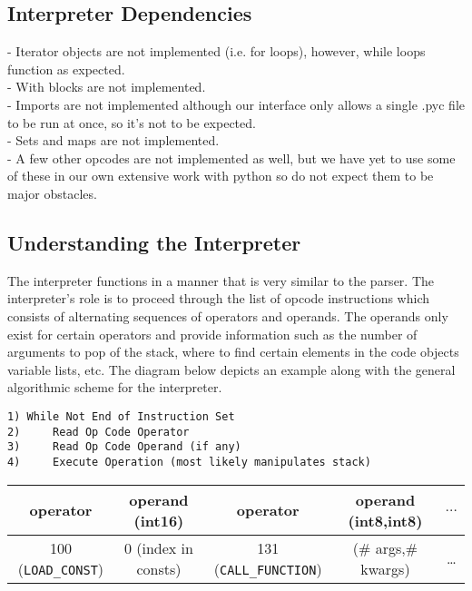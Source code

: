 \documentclass{article}
\begin{document}
\subsection{Interpreter Dependencies}

- Iterator objects are not implemented (i.e. for loops), however, while loops function as expected.\\
- With blocks are not implemented.\\
- Imports are not implemented although our interface only allows a single .pyc file to be run at once, so it's not to be expected.\\
- Sets and maps are not implemented.\\
- A few other opcodes are not implemented as well, but we have yet to use some of these in our own extensive work with python so do not expect them to be major obstacles.

\subsection{Understanding the Interpreter}

The interpreter functions in a manner that is very similar to the parser.  The interpreter's role is to proceed through the list of opcode instructions which consists of alternating sequences of operators and operands.  The operands only exist for certain operators and provide information such as the number of arguments to pop of the stack, where to find certain elements in the code objects variable lists, etc.  The diagram below depicts an example along with the general algorithmic scheme for the interpreter.%
\begin{verbatim}
1) While Not End of Instruction Set
2)     Read Op Code Operator
3)     Read Op Code Operand (if any)
4)     Execute Operation (most likely manipulates stack)
\end{verbatim}
\begin{tabular}{ c | c | c | c | c }
operator & operand (int16) & operator & operand (int8,int8) & $\ldots$ \\ \hline
100 (\verb!LOAD_CONST!) & 0 (index in consts) & 131 (\verb!CALL_FUNCTION!) & (\# args,\# kwargs) & \ldots \\ \hline
\end{tabular}
\end{document}

